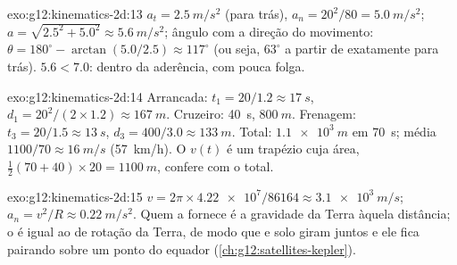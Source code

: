 \begin{solution}{exo:g12:kinematics-2d:13}
$a_t = \qty{2.5}{m/s^2}$ (para trás),
$a_n = 20^2/80 = \qty{5.0}{m/s^2}$;
$a = \sqrt{2.5^2 + 5.0^2} \approx \qty{5.6}{m/s^2}$; ângulo com a direção
do movimento:
$\theta = 180^\circ - \arctan(5.0/2.5) \approx 117^\circ$ (ou seja,
$63^\circ$ a partir de exatamente para trás). $5.6 < 7.0$: dentro da
aderência, com pouca folga.
\end{solution}

\begin{solution}{exo:g12:kinematics-2d:14}
Arrancada: $t_1 = 20/1.2 \approx \qty{17}{s}$,
$d_1 = 20^2/(2 \times 1.2) \approx \qty{167}{m}$. Cruzeiro:
\qty{40}{s}, $\qty{800}{m}$. Frenagem:
$t_3 = 20/1.5 \approx \qty{13}{s}$,
$d_3 = 400/3.0 \approx \qty{133}{m}$. Total: $\qty{1.1e3}{m}$ em
\qty{70}{s}; média $1100/70 \approx \qty{16}{m/s}$ (\qty{57}{km/h}). O
$v(t)$ é um trapézio cuja área,
$\tfrac12(70 + 40) \times 20 = \qty{1100}{m}$, confere com o total.
\end{solution}

\begin{solution}{exo:g12:kinematics-2d:15}
$v = 2\pi \times \num{4.22e7}/\num{86164} \approx \qty{3.1e3}{m/s}$;
$a_n = v^2/R \approx \qty{0.22}{m/s^2}$. Quem a fornece é a gravidade da
Terra àquela distância; o  é igual ao  de rotação da
Terra, de modo que  e solo giram juntos e ele fica pairando sobre
um ponto do equador (\cref{ch:g12:satellites-kepler}).
\end{solution}

